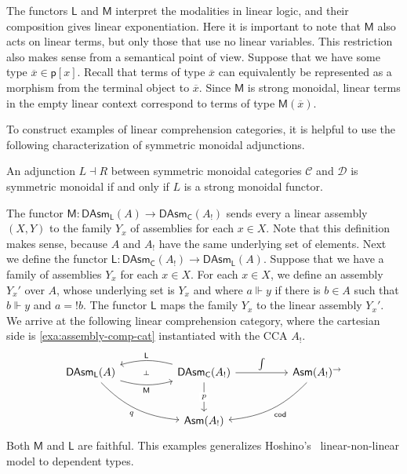 \documentclass[a4paper,UKenglish,cleveref,numberwithinsect, autoref, thm-restate]{lipics-v2021}
\newcommand{\fib}{\mathsf{p}}
\newcommand{\Arrow}[1]{#1^{\rightarrow}}
\newcommand{\cod}{\mathsf{cod}}
\newcommand{\fiber}[2]{#1[#2]}
\newcommand{\disp}[1]{\overline{#1}}
\newcommand{\xx}{\disp{x}}
\newcommand{\linL}{\mathsf{L}}
\newcommand{\linM}{\mathsf{M}}
\newcommand{\LCA}{A}
\newcommand{\LCAtoPCA}[1]{#1_!}
\newcommand{\Asm}[1]{\mathsf{Asm}(#1)}
\newcommand{\DAsm}[1]{\mathsf{DAsm}_{\mathsf{C}}(#1)}
\newcommand{\DAsmPr}{p}
\newcommand{\LAsm}[1]{\mathsf{DAsm}_{\mathsf{L}}(#1)}
\newcommand{\LAsmPr}{q}
\newcommand{\total}{\int}
\newcommand{\AsmL}{\mathsf{L}}
\newcommand{\AsmM}{\mathsf{M}}
\newcommand{\realize}{\Vdash}
\newcommand{\expL}[1]{\mathbin{!} #1}
\begin{document}
The functors $\linL$ and $\linM$ interpret the modalities in linear logic,
and their composition gives linear exponentiation.
Here it is important to note that $\linM$ also acts on linear terms,
but only those that use no linear variables.
This restriction also makes sense from a semantical point of view.
Suppose that we have some type $\xx \in \fiber{\fib}{x}$.
Recall that terms of type $\xx$ can equivalently be represented
as a morphism from the terminal object to $\xx$.
Since $\linM$ is strong monoidal,
linear terms in the empty linear context correspond to terms of type $\linM(\xx)$.

To construct examples of linear comprehension categories,
it is helpful to use the following characterization of symmetric monoidal adjunctions.

\begin{proposition}
An adjunction $L \dashv R$ between symmetric monoidal categories $\mathcal{C}$ and $\mathcal{D}$ is symmetric monoidal if and only if $L$ is a strong monoidal functor.
\end{proposition}

\begin{example}
\label{exa:lca-linear-comp-cat}
The functor $\linM : \LAsm{\LCA} \rightarrow \DAsm{\LCAtoPCA{\LCA}}$ sends every a linear assembly $(X, Y)$ to the family $Y_x$ of assemblies for each $x \in X$.
Note that this definition makes sense,
because $\LCA$ and $\LCAtoPCA{\LCA}$ have the same underlying set of elements.
Next we define the functor $\linL : \DAsm{\LCAtoPCA{\LCA}} \rightarrow \LAsm{\LCA}$.
Suppose that we have a family of assemblies $Y_x$ for each $x \in X$.
For each $x \in X$, we define an assembly $Y_x'$ over $\LCA$,
whose underlying set is $Y_x$
and where $a \realize y$ if there is $b \in A$
such that $b \realize y$ and $a = \expL{b}$.
The functor $\linL$ maps the family $Y_x$
to the linear assembly $Y_x'$.
We arrive at the following linear comprehension category, where the cartesian side is \autoref{exa:assembly-comp-cat} instantiated with the CCA $\LCAtoPCA{A}$.
\[
\begin{tikzcd}[column sep = huge, row sep = large]
	{\LAsm{\LCA}} & {\DAsm{\LCAtoPCA{\LCA}}} & {\Arrow{\Asm{\LCAtoPCA{\LCA}}}} \\
	& {\Asm{\LCAtoPCA{\LCA}}}
	\arrow[""{name=0, anchor=center, inner sep=0}, "\AsmM"', bend right=15, from=1-1, to=1-2]
	\arrow[""{name=1, anchor=center, inner sep=0}, "\AsmL"', bend right=15, from=1-2, to=1-1]
    \arrow["\LAsmPr"', bend right=20, from=1-1, to=2-2]
	\arrow["\total", from=1-2, to=1-3]
	\arrow["\DAsmPr"{description}, from=1-2, to=2-2]
	\arrow["\cod", bend left=20, from=1-3, to=2-2]
    \arrow["\dashv"{anchor=center, rotate=-90}, draw=none, from=0, to=1]
\end{tikzcd}
\]
Both $\AsmM$ and $\AsmL$ are faithful.
This examples generalizes Hoshino's~\cite{hoshino:2007} linear-non-linear model to dependent types.
\end{example}
\end{document}
